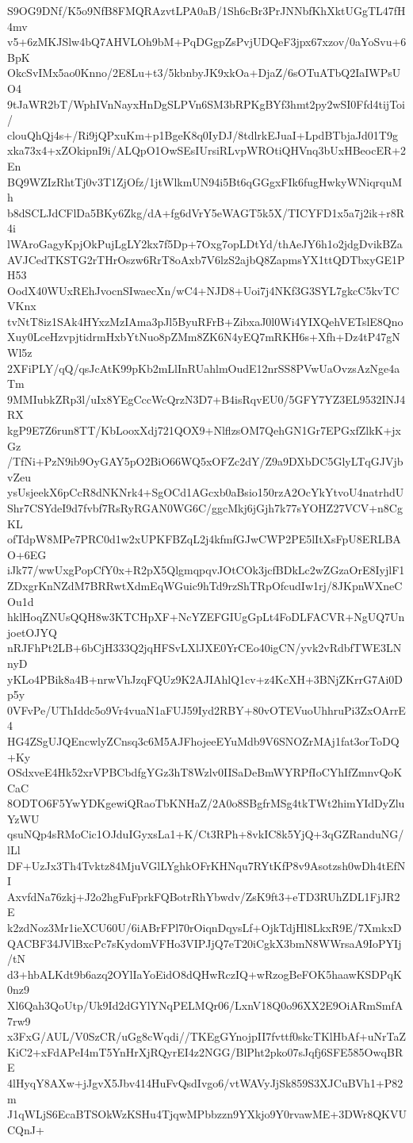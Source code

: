 S9OG9DNf/K5o9NfB8FMQRAzvtLPA0aB/1Sh6cBr3PrJNNbfKhXktUGgTL47fH4mv
v5+6zMKJSlw4bQ7AHVLOh9bM+PqDGgpZsPvjUDQeF3jpx67xzov/0aYoSvu+6BpK
OkcSvIMx5ao0Knno/2E8Lu+t3/5kbnbyJK9xkOa+DjaZ/6sOTuATbQ2IaIWPsUO4
9tJaWR2bT/WphIVnNayxHnDgSLPVn6SM3bRPKgBYf3hmt2py2wSI0Ffd4tijToi/
clouQhQj4s+/Ri9jQPxuKm+p1BgeK8q0IyDJ/8tdlrkEJuaI+LpdBTbjaJd01T9g
xka73x4+xZOkipnI9i/ALQpO1OwSEsIUrsiRLvpWROtiQHVnq3bUxHBeocER+2En
BQ9WZIzRhtTj0v3T1ZjOfz/1jtWlkmUN94i5Bt6qGGgxFIk6fugHwkyWNiqrquMh
b8dSCLJdCFlDa5BKy6Zkg/dA+fg6dVrY5eWAGT5k5X/TICYFD1x5a7j2ik+r8R4i
lWAroGagyKpjOkPujLgLY2kx7f5Dp+7Oxg7opLDtYd/thAeJY6h1o2jdgDvikBZa
AVJCedTKSTG2rTHrOszw6RrT8oAxb7V6lzS2ajbQ8ZapmsYX1ttQDTbxyGE1PH53
OodX40WUxREhJvocnSIwaecXn/wC4+NJD8+Uoi7j4NKf3G3SYL7gkcC5kvTCVKnx
tvNtT8iz1SAk4HYxzMzIAma3pJl5ByuRFrB+ZibxaJ0l0Wi4YIXQehVETslE8Qno
Xuy0LceHzvpjtidrmHxbYtNuo8pZMm8ZK6N4yEQ7mRKH6s+Xfh+Dz4tP47gNWl5z
2XFiPLY/qQ/qsJcAtK99pKb2mLlInRUahlmOudE12nrSS8PVwUaOvzsAzNge4aTm
9MMIubkZRp3l/uIx8YEgCccWcQrzN3D7+B4isRqvEU0/5GFY7YZ3EL9532INJ4RX
kgP9E7Z6run8TT/KbLooxXdj721QOX9+NlflzsOM7QehGN1Gr7EPGxfZlkK+jxGz
/TfNi+PzN9ib9OyGAY5pO2BiO66WQ5xOFZc2dY/Z9a9DXbDC5GlyLTqGJVjbvZeu
ysUsjeekX6pCcR8dNKNrk4+SgOCd1AGcxb0aBsio150rzA2OcYkYtvoU4natrhdU
Shr7CSYdeI9d7fvbf7RsRyRGAN0WG6C/ggcMkj6jGjh7k77sYOHZ27VCV+n8CgKL
ofTdpW8MPe7PRC0d1w2xUPKFBZqL2j4kfmfGJwCWP2PE5lItXsFpU8ERLBAO+6EG
iJk77/wwUxgPopCfY0x+R2pX5QlgmqpqvJOtCOk3jcfBDkLc2wZGzaOrE8IyjlF1
ZDxgrKnNZdM7BRRwtXdmEqWGuic9hTd9rzShTRpOfcudIw1rj/8JKpnWXneCOu1d
hklHoqZNUsQQH8w3KTCHpXF+NcYZEFGIUgGpLt4FoDLFACVR+NgUQ7UnjoetOJYQ
nRJFhPt2LB+6bCjH333Q2jqHFSvLXlJXE0YrCEo40igCN/yvk2vRdbfTWE3LNnyD
yKLo4PBik8a4B+nrwVhJzqFQUz9K2AJIAhlQ1cv+z4KcXH+3BNjZKrrG7Ai0Dp5y
0VFvPe/UThIddc5o9Vr4vuaN1aFUJ59Iyd2RBY+80vOTEVuoUhhruPi3ZxOArrE4
HG4ZSgUJQEncwlyZCnsq3c6M5AJFhojeeEYuMdb9V6SNOZrMAj1fat3orToDQ+Ky
OSdxveE4Hk52xrVPBCbdfgYGz3hT8Wzlv0IISaDeBmWYRPfIoCYhIfZmnvQoKCaC
8ODTO6F5YwYDKgewiQRaoTbKNHaZ/2A0o8SBgfrMSg4tkTWt2himYIdDyZluYzWU
qsuNQp4sRMoCic1OJduIGyxsLa1+K/Ct3RPh+8vkIC8k5YjQ+3qGZRanduNG/lLl
DF+UzJx3Th4Tvktz84MjuVGlLYghkOFrKHNqu7RYtKfP8v9Asotzsh0wDh4tEfNI
AxvfdNa76zkj+J2o2hgFuFprkFQBotrRhYbwdv/ZsK9ft3+eTD3RUhZDL1FjJR2E
k2zdNoz3Mr1ieXCU60U/6iABrFPl70rOiqnDqysLf+OjkTdjHl8LkxR9E/7XmkxD
QACBF34JVlBxcPc7sKydomVFHo3VIPJjQ7eT20iCgkX3bmN8WWrsaA9IoPYIj/tN
d3+hbALKdt9b6azq2OYlIaYoEidO8dQHwRczIQ+wRzogBeFOK5haawKSDPqK0nz9
Xl6Qah3QoUtp/Uk9Id2dGYlYNqPELMQr06/LxnV18Q0o96XX2E9OiARmSmfA7rw9
x3FxG/AUL/V0SzCR/uGg8cWqdi//TKEgGYnojpII7fvttf0skcTKlHbAf+uNrTaZ
KiC2+xFdAPeI4mT5YnHrXjRQyrEI4z2NGG/BlPht2pko07sJqfj6SFE585OwqBRE
4lHyqY8AXw+jJgvX5Jbv414HuFvQsdIvgo6/vtWAVyJjSk859S3XJCuBVh1+P82m
J1qWLjS6EcaBTSOkWzKSHu4TjqwMPbbzzn9YXkjo9Y0rvawME+3DWr8QKVUCQnJ+
